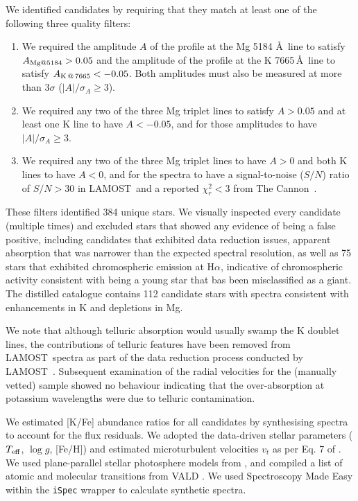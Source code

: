 \documentclass[a4paper,fleqn,usenatbib]{mnras}
\newcommand{\project}[1]{#1}
\newcommand{\lamost}{\project{LAMOST}}
\newcommand{\tc}{\project{The Cannon}}
\begin{document}
We identified candidates by requiring that they match at least one of the following three quality filters:
\begin{enumerate}
\item We required the amplitude $A$ of the profile at the Mg 5184 \AA \ line to satisfy $A_{{\rm Mg} @ 5184} > 0.05$ and the amplitude of the profile at the K 7665\,\AA\ line to satisfy $A_{{\rm K}\,@\,7665} < -0.05$. Both amplitudes must also be measured at more than $3\sigma$ ($|A|/\sigma_{A} \geq 3$).
\item We required any two of the three Mg triplet lines to satisfy $A > 0.05$ and at least one K line to have $A < -0.05$, and for those amplitudes to have $|A|/\sigma_{A} \geq 3$.
\item We required any two of the three Mg triplet lines to have $A > 0$ and both K lines to have $A < 0$, and for the spectra to have a signal-to-noise ($S/N$) ratio of $S/N > 30$ in \lamost\ and a reported $\chi_{r}^2 < 3$ from \tc\ \citep{ness2016,ho2017}.
\end{enumerate} 
 
These filters identified 384 unique stars. We visually inspected every candidate (multiple times) and excluded stars that showed any evidence of being a false positive, including candidates that exhibited data reduction issues, apparent absorption that was narrower than the expected spectral resolution, as well as 75 stars that exhibited chromospheric emission at H$\alpha$, indicative of chromospheric activity consistent with being a young star that bas been misclassified as a giant. The distilled catalogue contains 112 candidate stars with spectra consistent with enhancements in K and depletions in Mg.

We note that although telluric absorption would usually swamp the K doublet lines, the contributions of telluric features have been removed from \lamost\ spectra as part of the data reduction process conducted by \lamost\ \citep{luo2016vizier}. Subsequent examination of the radial velocities for the (manually vetted) sample showed no behaviour indicating that the over-absorption at potassium wavelengths were due to telluric contamination.

We estimated [K/Fe] abundance ratios for all candidates by synthesising spectra to account for the flux residuals. We adopted the data-driven stellar parameters ($T_{\rm eff}$, $\log{g}$, [Fe/H]) and estimated microturbulent velocities $v_t$ as per Eq. 7 of \citet{kirby2008}. We used plane-parallel stellar photosphere models from \citet{marcs}, and compiled a list of atomic and molecular transitions from VALD \citep{vald}. We used Spectroscopy Made Easy \citep{sme} within the \texttt{iSpec} wrapper \citep{ispec} to calculate synthetic spectra.
\end{document}
